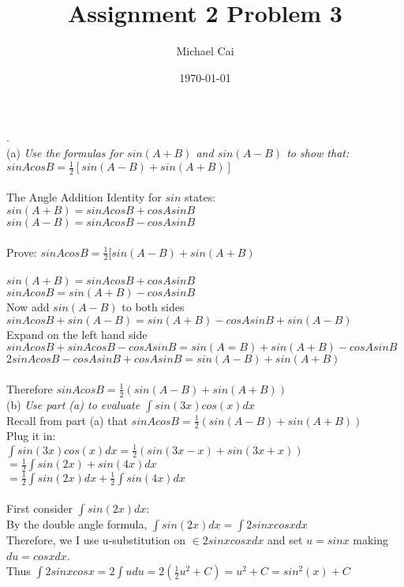 \documentclass[11pt, oneside]{article}   	%
\title{Assignment 2 Problem 3}
\author{Michael Cai}
\date{\today}							%
\begin{document}
\maketitle

. \\
(a)
\textit{Use the formulas for $sin(A+B)$ and $sin(A-B)$ to show that:}\\
$sinAcosB = \frac{1}{2}[sin(A-B) + sin(A+B)]$\\~\\
The Angle Addition Identity for $sin$ states:\\
$sin(A+B) = sinAcosB + cosAsinB$\\
$sin(A-B) = sinAcosB - cosAsinB$\\~\\
Prove: $sinAcosB = \frac{1}{2}[sin(A-B) + sin(A+B)$\\~\\
$sin(A+B) = sinAcosB + cosAsinB$\\
$sinAcosB = sin(A+B) - cosAsinB$\\
Now add $sin(A-B)$ to both sides\\
$sinAcosB + sin(A-B) = sin(A+B) -cosAsinB + sin(A-B)$\\
Expand on the left hand side\\
$sinAcosB + sinAcosB - cosAsinB = sin(A=B) +sin(A+B) - cosAsinB$\\
$2sinAcosB - cosAsinB + cosAsinB = sin(A-B) + sin(A+B)$\\~\\
Therefore $sinAcosB = \frac{1}{2}(sin(A-B) + sin(A+B))$\\

\noindent (b) \textit{Use part (a) to evaluate $\int sin(3x)cos(x)dx$}\\
Recall from part (a) that $sinAcosB = \frac{1}{2}(sin(A-B) + sin(A+B))$\\
Plug it in:\\
$\int sin(3x)cos(x)dx = \frac{1}{2}(sin(3x-x) + sin(3x+x))$\\
$= \frac{1}{2} \int sin(2x) + sin(4x)dx$\\
$= \frac{1}{2} \int sin(2x)dx + \frac{1}{2} \int sin(4x)dx$\\~\\
First consider $\int sin(2x)dx$:\\
By the double angle formula, $\int sin(2x)dx = \int 2sinxcosx dx$\\
Therefore, we I use u-substitution on $\in 2sinxcosx dx$ and set $u = sinx$ making $du = cosxdx$.\\
Thus $\int 2sinxcosx = 2 \int udu = 2 (\frac{1}{2} u^2 + C) = u^2 + C = sin^2(x) + C$\\~\\
\end{document}
